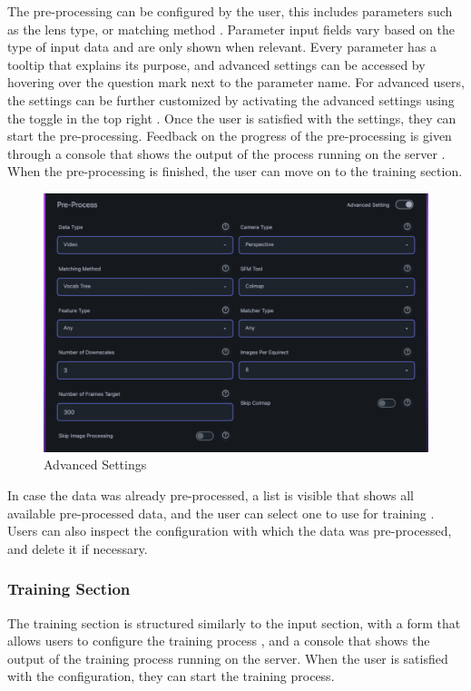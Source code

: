 The pre-processing can be configured by the user, this includes parameters such as the lens type, or matching method .
Parameter input fields vary based on the type of input data and are only shown when relevant.
Every parameter has a tooltip that explains its purpose, and advanced settings can be accessed by hovering over the question mark next to the parameter name.
For advanced users, the settings can be further customized by activating the advanced settings using the toggle in the top right .
Once the user is satisfied with the settings, they can start the pre-processing.
Feedback on the progress of the pre-processing is given through a console that shows the output of the process running on the server .
When the pre-processing is finished, the user can move on to the training section.

\begin{figure}[h!]
  \centering
  \includegraphics[width=.7\textwidth]{figures/view-extended-options.png}
  \caption{Advanced Settings}
  \label{fig:design:advanced-settings}
\end{figure}

In case the data was already pre-processed, a list is visible that shows all available pre-processed data, and the user can select one to use for training .
Users can also inspect the configuration with which the data was pre-processed, and delete it if necessary.

\subsubsection*{Training Section}

The training section is structured similarly to the input section, with a form that allows users to configure the training process , and a console that shows the output of the training process running on the server.
When the user is satisfied with the configuration, they can start the training process.

